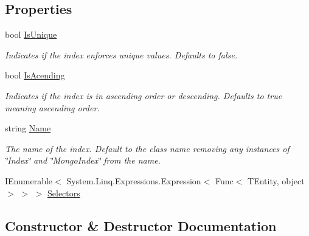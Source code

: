 \subsection*{Properties}
\begin{DoxyCompactItemize}
\item 
bool \hyperlink{classCqrs_1_1Mongo_1_1DataStores_1_1Indexes_1_1MongoIndex_a22720bf0b6c1ea7b910dd7e0bf0475d3_a22720bf0b6c1ea7b910dd7e0bf0475d3}{Is\+Unique}
\begin{DoxyCompactList}\small\item\em Indicates if the index enforces unique values. Defaults to false. \end{DoxyCompactList}\item 
bool \hyperlink{classCqrs_1_1Mongo_1_1DataStores_1_1Indexes_1_1MongoIndex_a59cbfafa9c0a32a8f9befddc3fb3956b_a59cbfafa9c0a32a8f9befddc3fb3956b}{Is\+Acending}
\begin{DoxyCompactList}\small\item\em Indicates if the index is in ascending order or descending. Defaults to true meaning ascending order. \end{DoxyCompactList}\item 
string \hyperlink{classCqrs_1_1Mongo_1_1DataStores_1_1Indexes_1_1MongoIndex_a635b552b98a7638ca3a474e54652fde6_a635b552b98a7638ca3a474e54652fde6}{Name}
\begin{DoxyCompactList}\small\item\em The name of the index. Default to the class name removing any instances of \char`\"{}\+Index\char`\"{} and \char`\"{}\+Mongo\+Index\char`\"{} from the name. \end{DoxyCompactList}\item 
I\+Enumerable$<$ System.\+Linq.\+Expressions.\+Expression$<$ Func$<$ T\+Entity, object $>$ $>$ $>$ \hyperlink{classCqrs_1_1Mongo_1_1DataStores_1_1Indexes_1_1MongoIndex_a43e73501f54becfaee4430a89841055a_a43e73501f54becfaee4430a89841055a}{Selectors}
\end{DoxyCompactItemize}


\subsection{Constructor \& Destructor Documentation}
\mbox{\label{classCqrs_1_1Mongo_1_1DataStores_1_1Indexes_1_1MongoIndex_a7affbb063520cd8c8bda27f8478efd06_a7affbb063520cd8c8bda27f8478efd06}} 
